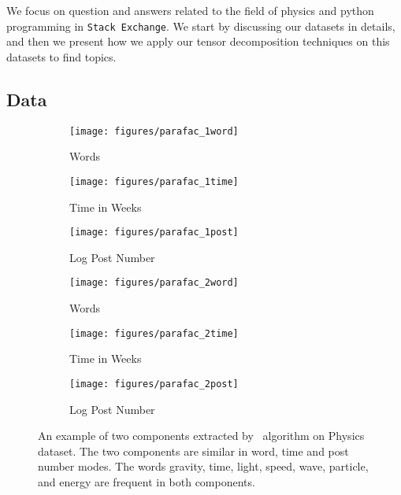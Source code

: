 We focus on question and answers related to the field of physics and python programming in \texttt{Stack
Exchange}. 
 We start by discussing our datasets in details, and then we present how we apply our tensor decomposition techniques on this datasets to find topics.

\subsection{Data}
\begin{figure*}
\captionsetup[subfigure]{aboveskip=-1pt,belowskip=-1pt}
  \centering
    \begin{subfigure}[b]{0.31\textwidth}
                \texttt{[image: figures/parafac\_1word]}
                \caption{Words}
                \label{fig:parafac_c1word}
        \end{subfigure}%
        \begin{subfigure}[b]{0.31\textwidth}
                \texttt{[image: figures/parafac\_1time]}
                \caption{Time in Weeks}
                \label{fig:parafac_c1time}
        \end{subfigure}%
\begin{subfigure}[b]{0.31\textwidth}
                \texttt{[image: figures/parafac\_1post]}
                \caption{Log Post Number}
                \label{fig:parafac_c1post}
        \end{subfigure}%
        
\begin{subfigure}[b]{0.31\textwidth}
                \texttt{[image: figures/parafac\_2word]}
                \caption{Words}
                \label{fig:parafac_c2word}
        \end{subfigure}%
        \begin{subfigure}[b]{0.31\textwidth}
                \texttt{[image: figures/parafac\_2time]}
                \caption{Time in Weeks}
                \label{fig:parafac_c2time}
        \end{subfigure}%
\begin{subfigure}[b]{0.31\textwidth}
                \texttt{[image: figures/parafac\_2post]}
                \caption{Log Post Number}
                \label{fig:parafac_c2post}
        \end{subfigure}%
        \caption{\label{fig:res_parafac}An example of two components extracted by \paraNS\ algorithm on Physics dataset. The two components are similar in word, time and post number modes. The words gravity, time, light, speed, wave, particle, and energy are frequent in both components. }
\end{figure*}

